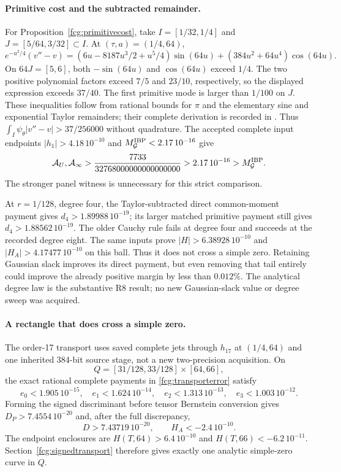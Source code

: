 \documentclass[11pt]{article}
\numberwithin{equation}{section}
\begin{document}
\paragraph{Primitive cost and the subtracted remainder.}
For Proposition~\ref{fcg:primitivecost}, take $I=[1/32,1/4]$ and
$J=[5/64,3/32]\subset I$. At $(\tau,a)=(1/4,64)$,
\[
 e^{-u^2/4}(v''-v)
 =(6u-8187u^3/2+u^5/4)\sin(64u)
                         +(384u^2+64u^4)\cos(64u).
\]
On $64J=[5,6]$, both $-\sin(64u)$ and $\cos(64u)$ exceed $1/4$.
The two positive polynomial factors exceed $7/5$ and $23/10$,
respectively, so the displayed expression exceeds $37/40$.
The first primitive mode is larger than $1/100$ on $J$.
These inequalities follow from rational bounds for $\pi$ and the
elementary sine and exponential Taylor remainders; their complete
derivation is recorded in \cite{FCGPrimitiveCost}. Thus
$\int_I\psi_\theta|v''-v|>37/256000$ without quadrature.
The accepted complete input endpoints $|h_1|>4.18\,10^{-10}$ and
$M_{\mathcal G}^{\rm IBP}<2.17\,10^{-16}$ give
\[
 \mathcal A_U,\mathcal A_\infty>
 \frac{7733}{32768000000000000000}
 >2.17\,10^{-16}>M_{\mathcal G}^{\rm IBP}.
\]
The stronger panel witness is unnecessary for this strict comparison.

At $r=1/128$, degree four, the Taylor-subtracted direct common-moment
payment gives $d_4>1.89988\,10^{-19}$; its larger matched primitive
payment still gives $d_4>1.88562\,10^{-19}$.
The older Cauchy rule fails at degree four and succeeds at the recorded
degree eight. The same inputs prove
$|H|>6.38928\,10^{-10}$ and $|H_A|>4.17477\,10^{-10}$ on this ball.
Thus it does not cross a simple zero. Retaining Gaussian slack
improves its direct payment, but even removing that tail entirely
could improve the already positive margin by less than $0.012\%$.
The analytical degree law is the substantive R8 result; no new
Gaussian-slack value or degree sweep was acquired.

\paragraph{A rectangle that does cross a simple zero.}
The order-17 transport uses saved complete jets through $h_{17}$ at
$(1/4,64)$ and one inherited 384-bit source stage, not a new
two-precision acquisition. On
\[
 Q=[31/128,33/128]\times[64,66],
\]
the exact rational complete payments in \eqref{fcg:transporterror}
satisfy
\[
 e_0<1.905\,10^{-15},\quad e_1<1.624\,10^{-14},\quad
 e_2<1.313\,10^{-13},\quad e_3<1.003\,10^{-12}.
\]
Forming the signed discriminant before tensor Bernstein conversion
gives $D_P>7.4554\,10^{-20}$ and, after the full discrepancy,
\[
 D>7.43719\,10^{-20},\qquad H_A<-2.4\,10^{-10}.
\]
The endpoint enclosures are $H(T,64)>6.4\,10^{-10}$ and
$H(T,66)<-6.2\,10^{-11}$. Section~\ref{fcg:signedtransport}
therefore gives exactly one analytic simple-zero curve in $Q$.
\end{document}
